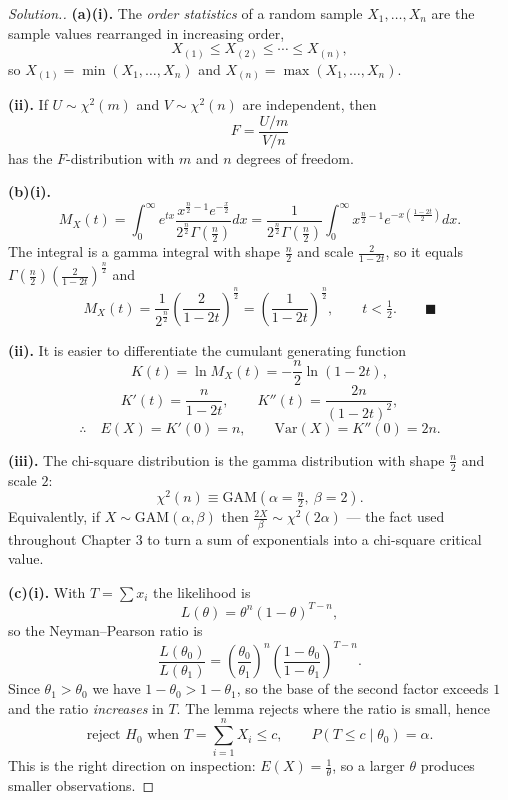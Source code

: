 \documentclass[12pt,a4paper]{report}
\theoremstyle{definition}
\theoremstyle{plain}
\newenvironment{solution}
  {\renewcommand{\qedsymbol}{}\begin{proof}[\textit{Solution}.]}
  {\end{proof}}
\begin{document}
\begin{solution}
\textbf{(a)(i).} The \emph{order statistics} of a random sample
$X_1,\ldots,X_n$ are the sample values rearranged in increasing order,
\[X_{(1)}\leq X_{(2)}\leq\cdots\leq X_{(n)},\]
so $X_{(1)}=\min(X_1,\ldots,X_n)$ and $X_{(n)}=\max(X_1,\ldots,X_n)$.

\textbf{(ii).} If $U\sim\chi^2(m)$ and $V\sim\chi^2(n)$ are independent, then
\[F=\frac{U/m}{V/n}\]
has the $F$-distribution with $m$ and $n$ degrees of freedom.

\textbf{(b)(i).}
\[M_X(t)=\int_0^\infty e^{tx}
\frac{x^{\frac{n}{2}-1}e^{-\frac{x}{2}}}
{2^{\frac{n}{2}}\Gamma\left(\frac{n}{2}\right)}dx
=\frac{1}{2^{\frac{n}{2}}\Gamma\left(\frac{n}{2}\right)}
\int_0^\infty x^{\frac{n}{2}-1}e^{-x\left(\frac{1-2t}{2}\right)}dx.\]
The integral is a gamma integral with shape $\frac{n}{2}$ and scale
$\frac{2}{1-2t}$, so it equals
$\Gamma\left(\frac{n}{2}\right)\left(\frac{2}{1-2t}\right)^{\frac{n}{2}}$ and
\[M_X(t)=\frac{1}{2^{\frac{n}{2}}}\left(\frac{2}{1-2t}\right)^{\frac{n}{2}}
=\left(\frac{1}{1-2t}\right)^{\frac{n}{2}},\qquad t<\tfrac12.\qquad\blacksquare\]

\textbf{(ii).} It is easier to differentiate the cumulant generating function
\[K(t)=\ln M_X(t)=-\frac{n}{2}\ln(1-2t),\]
\[K'(t)=\frac{n}{1-2t},\qquad K''(t)=\frac{2n}{(1-2t)^2},\]
\[\therefore\quad E(X)=K'(0)=n,\qquad \text{Var}(X)=K''(0)=2n.\]

\textbf{(iii).} The chi-square distribution is the gamma distribution with shape
$\frac{n}{2}$ and scale $2$:
\[\chi^2(n)\equiv\text{GAM}\left(\alpha=\tfrac{n}{2},\ \beta=2\right).\]
Equivalently, if $X\sim\text{GAM}(\alpha,\beta)$ then
$\frac{2X}{\beta}\sim\chi^2(2\alpha)$ --- the fact used throughout Chapter 3 to
turn a sum of exponentials into a chi-square critical value.

\textbf{(c)(i).} With $T=\sum x_i$ the likelihood is
\[L(\theta)=\theta^n(1-\theta)^{T-n},\]
so the Neyman--Pearson ratio is
\[\frac{L(\theta_0)}{L(\theta_1)}
=\left(\frac{\theta_0}{\theta_1}\right)^n
\left(\frac{1-\theta_0}{1-\theta_1}\right)^{T-n}.\]
Since $\theta_1>\theta_0$ we have $1-\theta_0>1-\theta_1$, so the base of the
second factor exceeds $1$ and the ratio \emph{increases} in $T$. The lemma
rejects where the ratio is small, hence
\[\text{reject } H_0 \text{ when } T=\sum_{i=1}^nX_i\leq c,\qquad
P\left(T\leq c\mid\theta_0\right)=\alpha.\]
This is the right direction on inspection: $E(X)=\frac{1}{\theta}$, so a larger
$\theta$ produces smaller observations.


\end{solution}
\end{document}

